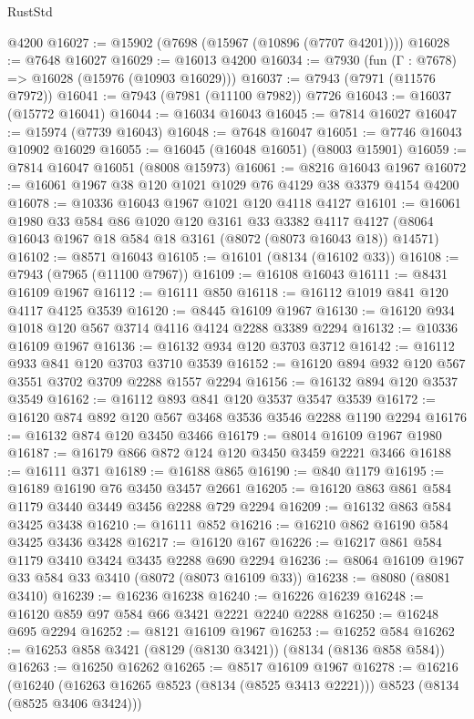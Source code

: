 \begin{lexlean}{RustStd}
\begin{coremodule}
{\begin{coremodule}
{{{{{{{{{{{{{{{{{{{{{{{{{{{{{{{{{{{{{{{{{{{{{{{{{{{{{    @4200
@16027 := @15902 (@7698 (@15967 (@10896 (@7707 @4201))))
@16028 := @7648 @16027
@16029 := @16013 @4200
@16034 := @7930 (fun (Γ : @7678) => @16028 (@15976 (@10903 @16029)))
@16037 := @7943 (@7971 (@11576 @7972))
@16041 := @7943 (@7981 (@11100 @7982)) @7726
@16043 := @16037 (@15772 @16041)
@16044 := @16034 @16043
@16045 := @7814 @16027
@16047 := @15974 (@7739 @16043)
@16048 := @7648 @16047
@16051 := @7746 @16043 @10902 @16029
@16055 := @16045 (@16048 @16051) (@8003 @15901)
@16059 := @7814 @16047 @16051 (@8008 @15973)
@16061 := @8216 @16043 @1967
@16072 := @16061 @1967 @38 @120 @1021 @1029 @76 @4129 @38 @3379 @4154 @4200
@16078 := @10336 @16043 @1967 @1021 @120 @4118 @4127
@16101 := @16061
    @1980
    @33
    @584
    @86
    @1020
    @120
    @3161
    @33
    @3382
    @4117
    @4127
    (@8064 @16043 @1967 @18 @584 @18 @3161 (@8072 (@8073 @16043 @18)) @14571)
@16102 := @8571 @16043
@16105 := @16101 (@8134 (@16102 @33))
@16108 := @7943 (@7965 (@11100 @7967))
@16109 := @16108 @16043
@16111 := @8431 @16109 @1967
@16112 := @16111 @850
@16118 := @16112 @1019 @841 @120 @4117 @4125 @3539
@16120 := @8445 @16109 @1967
@16130 := @16120 @934 @1018 @120 @567 @3714 @4116 @4124 @2288 @3389 @2294
@16132 := @10336 @16109 @1967
@16136 := @16132 @934 @120 @3703 @3712
@16142 := @16112 @933 @841 @120 @3703 @3710 @3539
@16152 := @16120 @894 @932 @120 @567 @3551 @3702 @3709 @2288 @1557 @2294
@16156 := @16132 @894 @120 @3537 @3549
@16162 := @16112 @893 @841 @120 @3537 @3547 @3539
@16172 := @16120 @874 @892 @120 @567 @3468 @3536 @3546 @2288 @1190 @2294
@16176 := @16132 @874 @120 @3450 @3466
@16179 := @8014 @16109 @1967 @1980
@16187 := @16179 @866 @872 @124 @120 @3450 @3459 @2221 @3466
@16188 := @16111 @371
@16189 := @16188 @865
@16190 := @840 @1179
@16195 := @16189 @16190 @76 @3450 @3457 @2661
@16205 := @16120 @863 @861 @584 @1179 @3440 @3449 @3456 @2288 @729 @2294
@16209 := @16132 @863 @584 @3425 @3438
@16210 := @16111 @852
@16216 := @16210 @862 @16190 @584 @3425 @3436 @3428
@16217 := @16120 @167
@16226 := @16217 @861 @584 @1179 @3410 @3424 @3435 @2288 @690 @2294
@16236 := @8064 @16109 @1967 @33 @584 @33 @3410 (@8072 (@8073 @16109 @33))
@16238 := @8080 (@8081 @3410)
@16239 := @16236 @16238
@16240 := @16226 @16239
@16248 := @16120 @859 @97 @584 @66 @3421 @2221 @2240 @2288
@16250 := @16248 @695 @2294
@16252 := @8121 @16109 @1967
@16253 := @16252 @584
@16262 := @16253 @858 @3421 (@8129 (@8130 @3421)) (@8134 (@8136 @858 @584))
@16263 := @16250 @16262
@16265 := @8517 @16109 @1967
@16278 := @16216
    (@16240 (@16263 @16265 @8523 (@8134 (@8525 @3413 @2221))) @8523 (@8134 (@8525 @3406 @3424)))
}}}}}}}}}}}}}}}}}}}}}}}}}}}}}}}}}}}}}}}}}}}}}}}}}}}}}
\end{coremodule}}
\end{coremodule}
\end{lexlean}
